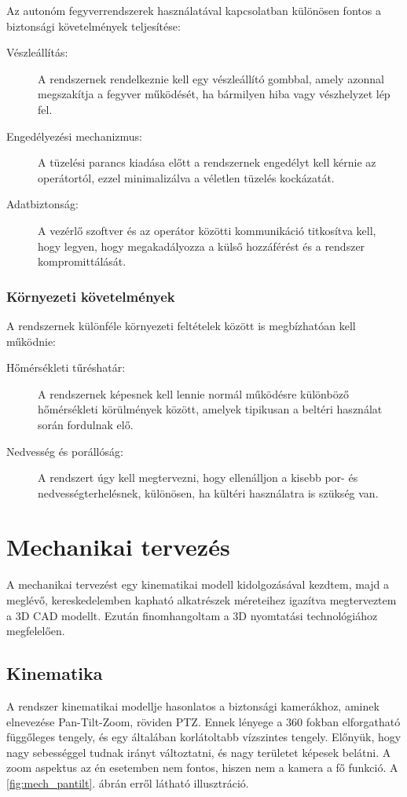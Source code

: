 \documentclass[12pt,a4paper]{article}
\begin{document}
Az autonóm fegyverrendszerek használatával kapcsolatban különösen fontos a biztonsági követelmények teljesítése:

\begin{description}
	\item[Vészleállítás:]A rendszernek rendelkeznie kell egy vészleállító gombbal, amely azonnal megszakítja a fegyver működését, ha bármilyen hiba vagy vészhelyzet lép fel.
	\item[Engedélyezési mechanizmus:] A tüzelési parancs kiadása előtt a rendszernek engedélyt kell kérnie az operátortól, ezzel minimalizálva a véletlen tüzelés kockázatát.
	\item[Adatbiztonság:] A vezérlő szoftver és az operátor közötti kommunikáció titkosítva kell, hogy legyen, hogy megakadályozza a külső hozzáférést és a rendszer kompromittálását.
\end{description}

\subsubsection*{Környezeti követelmények}

A rendszernek különféle környezeti feltételek között is megbízhatóan kell működnie:

\begin{description}
	\item[Hőmérsékleti tűréshatár:]A rendszernek képesnek kell lennie normál működésre különböző hőmérsékleti körülmények között, amelyek tipikusan a beltéri használat során fordulnak elő.
	\item[Nedvesség és porállóság:] A rendszert úgy kell megtervezni, hogy ellenálljon a kisebb por- és nedvességterhelésnek, különösen, ha kültéri használatra is szükség van.
\end{description}

\pagebreak
\section{Mechanikai tervezés}
A mechanikai tervezést egy kinematikai modell kidolgozásával kezdtem, majd a meglévő, kereskedelemben kapható alkatrészek méreteihez igazítva megterveztem a 3D CAD modellt. Ezután finomhangoltam a 3D nyomtatási technológiához megfelelően.
\subsection{Kinematika}
A rendszer kinematikai modellje hasonlatos a biztonsági kamerákhoz, aminek elnevezése Pan-Tilt-Zoom, röviden PTZ. Ennek lényege a 360 fokban elforgatható függőleges tengely, és egy általában korlátoltabb vízszintes tengely. Előnyük, hogy nagy sebességgel tudnak irányt változtatni, és nagy területet képesek belátni. A zoom aspektus az én esetemben nem fontos, hiszen nem a kamera a fő funkció. A \ref{fig:mech_pantilt}. ábrán erről látható illusztráció.
\end{document}
